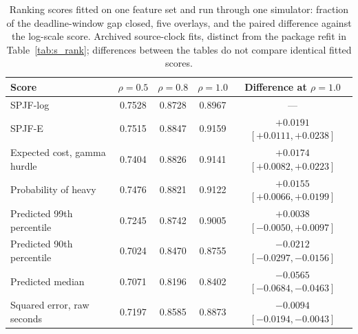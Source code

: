\documentclass[mathematics,supfile,submit,moreauthors]{Definitions/mdpi}
\newcommand{\devnum}[1]{#1}
\begin{document}
\begin{table}[htbp]
\centering
\caption{Ranking scores fitted on one feature set and run through one simulator: fraction of the
deadline-window gap closed, five overlays, and the paired difference against the log-scale
score. Archived source-clock fits, distinct from the package refit in
Table~\ref{tab:s_rank}; differences between the tables do not compare identical fitted scores.}
\label{tab:s_scores}
\small
\begin{tabular}{lcccc}
\toprule
Score & $\rho = \devnum{0.5}$ & $\rho = \devnum{0.8}$ & $\rho = \devnum{1.0}$ & Difference at $\rho = \devnum{1.0}$ \\
\midrule
SPJF-log                   & \devnum{0.7528} & \devnum{0.8728} & \devnum{0.8967} & --- \\
SPJF-E                     & \devnum{0.7515} & \devnum{0.8847} & \devnum{0.9159} & \devnum{$+0.0191$ $[+0.0111, +0.0238]$} \\
Expected cost, gamma hurdle & \devnum{0.7404} & \devnum{0.8826} & \devnum{0.9141} & \devnum{$+0.0174$ $[+0.0082, +0.0223]$} \\
Probability of heavy       & \devnum{0.7476} & \devnum{0.8821} & \devnum{0.9122} & \devnum{$+0.0155$ $[+0.0066, +0.0199]$} \\
Predicted 99th percentile  & \devnum{0.7245} & \devnum{0.8742} & \devnum{0.9005} & \devnum{$+0.0038$ $[-0.0050, +0.0097]$} \\
Predicted 90th percentile  & \devnum{0.7024} & \devnum{0.8470} & \devnum{0.8755} & \devnum{$-0.0212$ $[-0.0297, -0.0156]$} \\
Predicted median           & \devnum{0.7071} & \devnum{0.8196} & \devnum{0.8402} & \devnum{$-0.0565$ $[-0.0684, -0.0463]$} \\
Squared error, raw seconds & \devnum{0.7197} & \devnum{0.8585} & \devnum{0.8873} & \devnum{$-0.0094$ $[-0.0194, -0.0043]$} \\
\bottomrule
\end{tabular}
\end{table}
\end{document}
